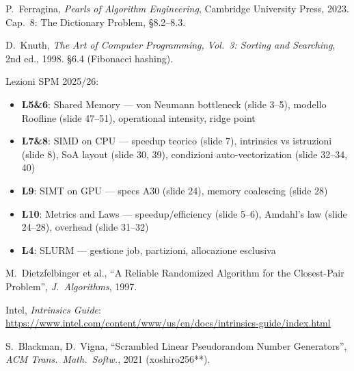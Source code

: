 \documentclass[11pt,a4paper]{article}
\begin{document}
\begin{enumerate}[label={[\arabic*]}]
    \item P.\ Ferragina, \textit{Pearls of Algorithm Engineering}, Cambridge University Press, 2023. Cap.\ 8: The Dictionary Problem, §8.2--8.3.
    \item D.\ Knuth, \textit{The Art of Computer Programming, Vol.\ 3: Sorting and Searching}, 2nd ed., 1998. §6.4 (Fibonacci hashing).
    \item Lezioni SPM 2025/26:
    \begin{itemize}
        \item \textbf{L5\&6}: Shared Memory --- von Neumann bottleneck (slide 3--5), modello Roofline (slide 47--51), operational intensity, ridge point
        \item \textbf{L7\&8}: SIMD on CPU --- speedup teorico (slide 7), intrinsics vs istruzioni (slide 8), SoA layout (slide 30, 39), condizioni auto-vectorization (slide 32--34, 40)
        \item \textbf{L9}: SIMT on GPU --- specs A30 (slide 24), memory coalescing (slide 28)
        \item \textbf{L10}: Metrics and Laws --- speedup/efficiency (slide 5--6), Amdahl's law (slide 24--28), overhead (slide 31--32)
        \item \textbf{L4}: SLURM --- gestione job, partizioni, allocazione esclusiva
    \end{itemize}
    \item M.\ Dietzfelbinger et al., ``A Reliable Randomized Algorithm for the Closest-Pair Problem'', \textit{J.\ Algorithms}, 1997.
    \item Intel, \textit{Intrinsics Guide}: \url{https://www.intel.com/content/www/us/en/docs/intrinsics-guide/index.html}
    \item S.\ Blackman, D.\ Vigna, ``Scrambled Linear Pseudorandom Number Generators'', \textit{ACM Trans.\ Math.\ Softw.}, 2021 (xoshiro256**).
\end{enumerate}
\end{document}
